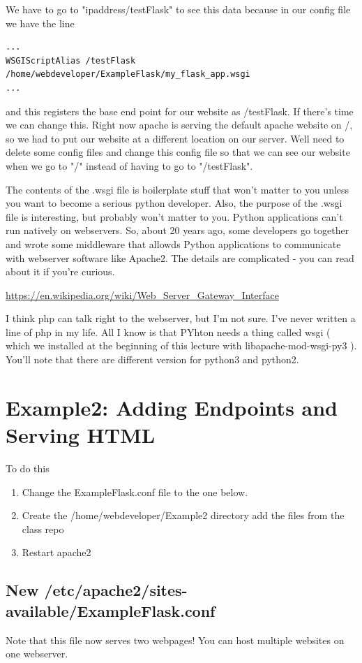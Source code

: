 \documentclass[10pt]{article}
\begin{document}
We have to go to "ipaddress/testFlask" to see this data because in our config file we have the line

\begin{lstlisting}[style=sh]
...
WSGIScriptAlias /testFlask /home/webdeveloper/ExampleFlask/my_flask_app.wsgi
...
\end{lstlisting}

and this registers the base end point for our website as /testFlask. If there's time we can change this. Right now apache is serving the default apache website on /, so we had to put our website at a different location on our server. Well need to delete some config files and change this config file so that we can see our website when we go to "/" instead of having to go to "/testFlask".

The contents of the .wsgi file is boilerplate stuff that won't matter to you unless you want to become a serious python developer. Also, the purpose of the .wsgi file is interesting, but probably won't matter to you. Python applications can't run natively on webservers. So, about 20 years ago, some developers go together and wrote some middleware that allowds Python applications to communicate with webserver software like Apache2. The details are complicated - you can read about it if you're curious. 

\url{https://en.wikipedia.org/wiki/Web_Server_Gateway_Interface}

I think php can talk right to the webserver, but I'm not sure. I've never written a line of php in my life. All I know is that PYhton needs a thing called wsgi ( which we installed at the beginning of this lecture with libapache-mod-wsgi-py3 ). You'll note that there are different version for python3 and python2.

\section{Example2: Adding Endpoints and Serving HTML}
To do this
\begin{enumerate}
\item Change the ExampleFlask.conf file to the one below.
\item Create the /home/webdeveloper/Example2 directory add the files from the class repo
\item Restart apache2
\end{enumerate}

\subsection{New /etc/apache2/sites-available/ExampleFlask.conf}
Note that this file now serves two webpages! You can host multiple websites on one webserver.

\end{document}
